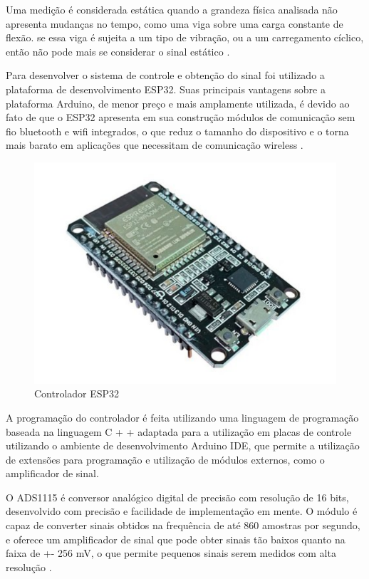 Uma medição é considerada estática quando a grandeza física analisada não apresenta mudanças no tempo, como uma viga sobre uma carga constante de flexão. se essa viga é sujeita a um tipo de vibração, ou a um carregamento cíclico, então não pode mais se considerar o sinal estático \autocite{Hollman2011}.

Para desenvolver o sistema de controle e obtenção do sinal foi utilizado a plataforma de desenvolvimento ESP32. Suas principais vantagens sobre a plataforma Arduino, de menor preço e mais amplamente utilizada, é devido ao fato de que o ESP32 apresenta em sua construção módulos de comunicação sem fio bluetooth e wifi integrados, o que reduz o tamanho do dispositivo e o torna mais barato em aplicações que necessitam de comunicação wireless \autocite{DocsESP32}.

\begin{figure}[htb]
	\caption{\label{fig:1140} Controlador ESP32}
	\begin{center}
		\includegraphics[width=\textwidth]{pictures/1140.png}
	\end{center}
\end{figure}

A programação do controlador é feita utilizando uma linguagem de programação baseada na linguagem C + + adaptada para a utilização em placas de controle utilizando o ambiente de desenvolvimento Arduino IDE, que permite a utilização de extensões para programação e utilização de módulos externos, como o amplificador de sinal.

O ADS1115 é conversor analógico digital de precisão com resolução de 16 bits, desenvolvido com precisão e facilidade de implementação em mente. O módulo é capaz de converter sinais obtidos na frequência de até 860 amostras por segundo, e oferece um amplificador de sinal que pode obter sinais tão baixos quanto na faixa de +- 256 mV, o que permite pequenos sinais serem medidos com alta resolução \autocite{DocsADS1115}.

